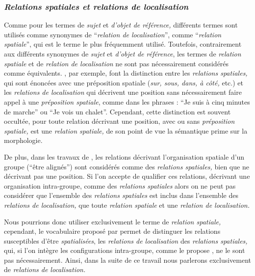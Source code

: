 \subsubsection{\emph{Relations spatiales et relations de localisation}}

Comme pour les termes de \emph{sujet} et \emph{d'objet de référence,}
différents termes sont utilisés comme synonymes de
\enquote{\emph{relation de localisation}}, comme
\enquote{\emph{relation spatiale}}, qui est le terme le plus
fréquemment utilisé. Toutefois, contrairement aux différents synonymes
de \emph{sujet} et \emph{d'objet de référence}, les termes de
\emph{relation spatiale} et de \emph{relation de localisation} ne sont
pas nécessairement considérés comme
équivalents. \textcite{Duchene2019}, par exemple, font la distinction
entre les \emph{relations spatiales,} qui sont énoncées avec une
préposition spatiale (\eg \emph{sur, sous, dans, à côté,} etc.) et les
\emph{relations de localisation} qui décrivent une position sans
nécessairement faire appel à une \emph{préposition spatiale}, comme
dans les phrases : \enquote{Je suis à cinq minutes de marche} ou
\enquote{Je vois un chalet}. Cependant, cette distinction est souvent
occultée, pour \textcite{Vandeloise1986} toute relation décrivant une
position, avec ou sans \emph{préposition spatiale,} est une
\emph{relation spatiale,} de son point de vue la sémantique prime sur
la morphologie.

De plus, dans les travaux de \textcite{Bateman2010}, les relations
décrivant l'organisation spatiale d'un groupe (\eg \enquote{être
  alignés}) sont considérés comme des \emph{relations spatiales,} bien
que ne décrivant pas une position. Si l'on accepte de qualifier ces
relations, décrivant une organisation intra-groupe, comme des
\emph{relations spatiales} alors on ne peut pas considérer que
l'ensemble des \emph{relations spatiales} est inclus dans l'ensemble
des \emph{relations de localisation,} \ie que toute \emph{relation
  spatiale} et une \emph{relation de localisation.}

Nous pourrions donc utiliser exclusivement le terme de \emph{relation
  spatiale,} cependant, le vocabulaire proposé par
\textcite{Duchene2019} permet de distinguer les relations susceptibles
d'être \emph{spatialisées}, \ie les \emph{relations de localisation}
des \emph{relations spatiales,} qui, si l'on intègre les
configurations intra-groupe, comme le propose \textcite{Bateman2010},
ne le sont pas nécessairement. Ainsi, dans la suite de ce travail nous
parlerons exclusivement de \emph{relations de localisation.}

